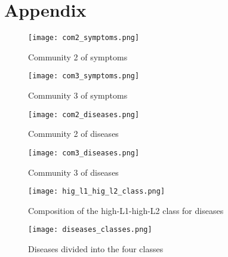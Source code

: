 \section{Appendix}


\begin{figure}[H]
	\centering
	\texttt{[image: com2\_symptoms.png]}
	\caption{Community 2 of symptoms}\label{fig:com2_symptoms}
\end{figure}
\noindent
\begin{figure}[H]
	\centering
	\texttt{[image: com3\_symptoms.png]}
	\caption{Community 3 of symptoms}\label{fig:com3_symptoms}
\end{figure}
\noindent


\begin{figure}[H]
	\centering
	\texttt{[image: com2\_diseases.png]}
	\caption{Community 2 of diseases}\label{fig:com2_diseases}
\end{figure}
\noindent
\begin{figure}[H]
	\centering
	\texttt{[image: com3\_diseases.png]}
	\caption{Community 3 of diseases}\label{fig:com3_diseases}
\end{figure}
\noindent

\begin{figure*}[!t]
	\centering
	\texttt{[image: hig\_l1\_hig\_l2\_class.png]}
	\caption{Composition of the high-L1-high-L2 class for diseases}\label{fig:high_l1_high_l2_class}
\end{figure*}

\begin{figure}[H]
	\centering
	\texttt{[image: diseases\_classes.png]}
	\caption{Diseases divided into the four classes}\label{fig:diseases_classes}
\end{figure}
